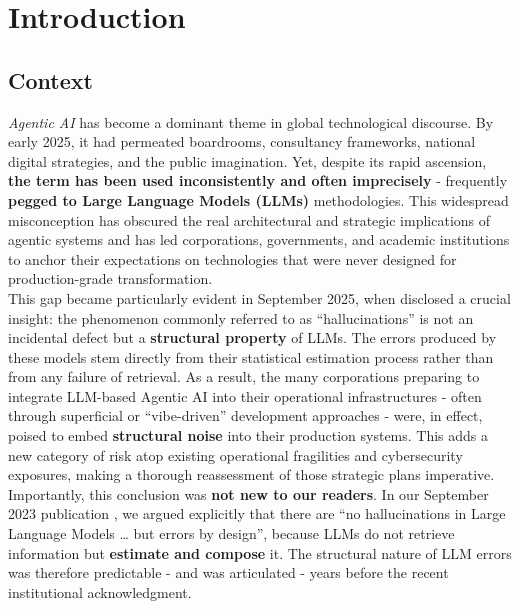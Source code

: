 \documentclass{article}
\begin{document}
\section{Introduction}
\label{section: Introduction}


\subsection{Context}
\label{subsection: Context}

\textit{Agentic AI} has become a dominant theme in global technological discourse. By early 2025, it had permeated boardrooms, consultancy frameworks, national digital strategies, and the public imagination. Yet, despite its rapid ascension, \textbf{the term has been used inconsistently and often imprecisely} - frequently \textbf{pegged to Large Language Models (LLMs)} methodologies. This widespread misconception has obscured the real architectural and strategic implications of agentic systems and has led corporations, governments, and academic institutions to anchor their expectations on technologies that were never designed for production-grade transformation.\\

This gap became particularly evident in September 2025, when \cite{Why_Hallucinate} disclosed a crucial insight: the phenomenon commonly referred to as “hallucinations” is not an incidental defect but a \textbf{structural property} of LLMs. The errors produced by these models stem directly from their statistical estimation process rather than from any failure of retrieval. As a result, the many corporations preparing to integrate LLM-based Agentic AI into their operational infrastructures - often through superficial or “vibe-driven” development approaches - were, in effect, poised to embed \textbf{structural noise} into their production systems. This adds a new category of risk atop existing operational fragilities and cybersecurity exposures, making a thorough reassessment of those strategic plans imperative.\\

Importantly, this conclusion was \textbf{not new to our readers}. In our September 2023 publication \cite{Digital Washing}, we argued explicitly that there are “no hallucinations in Large Language Models … but errors by design”, because LLMs do not retrieve information but \textbf{estimate and compose} it. The structural nature of LLM errors was therefore predictable - and was articulated - years before the recent institutional acknowledgment.\\
\end{document}
